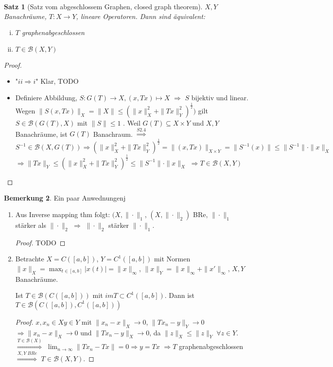 \documentclass[ngerman]{report}
\theoremstyle{plain}%
\newtheorem{thm}{Satz}[chapter]
\theoremstyle{definition}%
\theoremstyle{myStyle}
\newtheorem{bem}[thm]{Bemerkung}
\newcommand{\B}{\mathcal{B}} %
\newcommand{\BS}[1][X,Y]{\mathcal{B}(#1)} %
\newcommand{\norm}[1]{\|#1\|}
\newcommand{\df}[1][]{%
	\overset{#1}{\Rightarrow}
}
\newcommand{\limes}[1][\infty]{\lim_{n \to #1}}
\newcommand{\inv}[1]{#1^{-1}}
\newcommand{\qmarks}[1]{"#1"}
\begin{document}
	\begin{thm}[Satz vom abgeschlossem Graphen, closed graph theorem]
		$X,Y$ Banachräume, $T: X\to Y$, lineare Operatoren. Dann sind äquivalent:
			\begin{enumerate}[(i)]
				\item $T$ graphenabgeschlossen
				\item $T\in \BS$
			\end{enumerate}
	\end{thm}

	\begin{proof}
		\begin{itemize}
			\item \qmarks{$ii\df i$} Klar, TODO
			\item Definiere Abbildung, $S: G(T) \to X, (x,Tx) \mapsto X$
			$\df$ $S$ bijektiv und linear. Wegen 
				$\norm{S(x,Tx)}_X = \norm{X} \leq (\norm{x}_X^2 + \norm{Tx}_Y^2)^{\frac{1}{2}})$
				gilt $S\in \B(G(T),X)$ mit $\norm{S} \leq 1$ .
				Weil $G(T) \subseteq X\times Y$ und $X,Y$ Banachräume, ist $G(T)$ Banachraum.
				$\df[S2.4]$ $\inv{S} \in \B(X, G(T)) \df (\norm{x}_X^2 + \norm{Tx}_Y^2)^{\frac{1}{2}} = \norm{(x,Tx)}_{X\times Y} = \norm{\inv{S}(x)} \leq \norm{\inv{S}} \cdot \norm{x}_X$
				$\df \norm{Tx}_Y \leq (\norm{x}_X^2 + \norm{Tx}_Y^2)^{\frac{1}{2}} \leq \norm{\inv{S}}\cdot\norm{x}_X$
				$\df T\in\BS$
		\end{itemize}
	\end{proof}

	\begin{bem}
		Ein paar Anwednungenj
		\begin{enumerate}
			\item Aus Inverse mapping thm folgt: $(X,\norm{\cdot}_1$, $(X,\norm{\cdot}_2)$ BRe, $\norm{\cdot}_1$ stärker als $\norm{\cdot}_2$ $\df$
				 $\norm{\cdot}_2$ stärker $\norm{\cdot}_1.$
				 \begin{proof}
				 TODO
				 \end{proof}
			\item Betrachte $X = C([a,b])$, $Y = C^1([a,b])$ mit Normen $\norm{x}_X = \max_{t\in[a,b]} |x(t) | = \norm{x}_\infty$, $\norm{x}_Y = \norm{x}_\infty + \norm{x'}_\infty$, $X,Y$ Banachräume.\par
			Ist $T\in \B(C([a,b]))$ mit $imT \subset C^1([a,b])$. Dann ist $T\in \B(C([a,b]), C^1([a,b]))$
				\begin{proof}
					$x, x_n \in X y\in Y$ mit $\norm{x_n - x}_X \to 0$, $\norm{Tx_n - y}_Y \to 0$
					$\df \norm{x_n - x}_X \to 0$ und $\norm{Tx_n - y}_X \to 0$, da $\norm{z}_X \leq \norm{z}_Y \; \forall z\in Y$. $\df[T\in\B(X)]$ $\limes \norm{Tx_n - Tx} = 0 \df y = Tx$
					$\df T$ graphenabgeschlossen $\df[X,Y \; BRe]$ $T\in \BS$.
				\end{proof}
		\end{enumerate}

	\end{bem}
\end{document}
